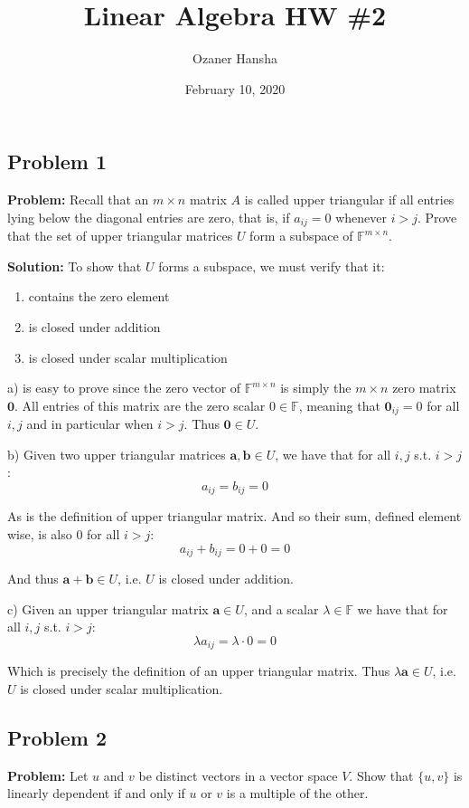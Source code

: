 \documentclass{article}
\renewcommand\vec{\mathbf}
\begin{document}
\title{Linear Algebra HW \#2}
\author{Ozaner Hansha}
\date{February 10, 2020}
\maketitle

\subsection*{Problem 1}
\noindent\textbf{Problem:} Recall that an $m\times n$ matrix $A$ is called upper triangular if all entries lying below the diagonal entries are zero, that is, if $a_{ij}=0$ whenever $i>j$. Prove that the set of upper triangular matrices $U$ form a subspace of $\mathbb F^{m\times n}$.
\bigskip

\noindent\textbf{Solution:} To show that $U$ forms a subspace, we must verify that it:

\begin{enumerate}[label=\textbf{\alph*)}]
    \item contains the zero element
    \item is closed under addition
    \item is closed under scalar multiplication
\end{enumerate}

a) is easy to prove since the zero vector of $\mathbb F^{m\times n}$ is simply the $m\times n$ zero matrix $\vec 0$. All entries of this matrix are the zero scalar $0\in\mathbb F$, meaning that $\vec 0_{ij}=0$ for all $i,j$ and in particular when $i>j$. Thus $\vec 0\in U$.

b) Given two upper triangular matrices $\vec a,\vec b\in U$, we have that for all $i,j$ s.t. $i>j$:
$$a_{ij}=b_{ij}=0$$

As is the definition of upper triangular matrix. And so their sum, defined element wise, is also 0 for all $i>j$:
$$a_{ij}+b_{ij}=0+0=0$$

And thus $\vec a+\vec b\in U$, i.e. $U$ is closed under addition.

c) Given an upper triangular matrix $\vec a\in U$, and a scalar $\lambda\in\mathbb F$ we have that for all $i,j$ s.t. $i>j$:
$$\lambda a_{ij}=\lambda\cdot0=0$$

Which is precisely the definition of an upper triangular matrix. Thus $\lambda\vec a\in U$, i.e. $U$ is closed under scalar multiplication.

\subsection*{Problem 2}
\noindent\textbf{Problem:} Let $u$ and $v$ be distinct vectors in a vector space $V$. Show that $\{u, v\}$ is linearly dependent if and only if $u$ or $v$ is a multiple of the other.
\bigskip
\end{document}

